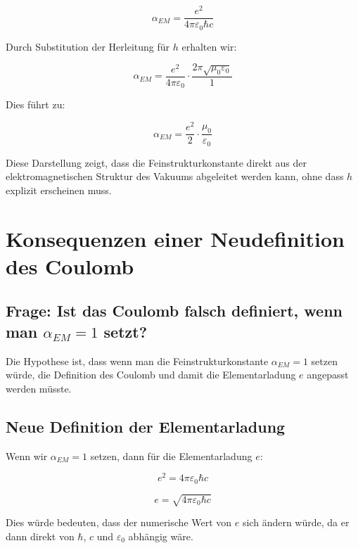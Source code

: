 \documentclass[12pt,a4paper]{article}
\begin{document}
	\begin{equation}
		\alpha_{EM} = \frac{e^2}{4\pi\varepsilon_0\hbar c}
	\end{equation}
	
	Durch Substitution der Herleitung für $h$ erhalten wir:
	
	\begin{equation}
		\alpha_{EM} = \frac{e^2}{4\pi\varepsilon_0} \cdot \frac{2\pi\sqrt{\mu_0\varepsilon_0}}{1}
	\end{equation}
	
	Dies führt zu:
	
	\begin{equation}
		\alpha_{EM} = \frac{e^2}{2} \cdot \frac{\mu_0}{\varepsilon_0}
	\end{equation}
	
	Diese Darstellung zeigt, dass die Feinstrukturkonstante direkt aus der elektromagnetischen Struktur des Vakuums abgeleitet werden kann, ohne dass $h$ explizit erscheinen muss.
	
	\section{Konsequenzen einer Neudefinition des Coulomb}
	
	\subsection{Frage: Ist das Coulomb falsch definiert, wenn man $\alpha_{EM} = 1$ setzt?}
	
	Die Hypothese ist, dass wenn man die Feinstrukturkonstante $\alpha_{EM} = 1$ setzen würde, die Definition des Coulomb und damit die Elementarladung $e$ angepasst werden müsste.
	
	\subsection{Neue Definition der Elementarladung}
	
	Wenn wir $\alpha_{EM} = 1$ setzen, dann für die Elementarladung $e$:
	
	\begin{equation}
		e^2 = 4\pi\varepsilon_0\hbar c
	\end{equation}
	
	\begin{equation}
		e = \sqrt{4\pi\varepsilon_0\hbar c}
	\end{equation}
	
	Dies würde bedeuten, dass der numerische Wert von $e$ sich ändern würde, da er dann direkt von $\hbar$, $c$ und $\varepsilon_0$ abhängig wäre.
	
\end{document}
